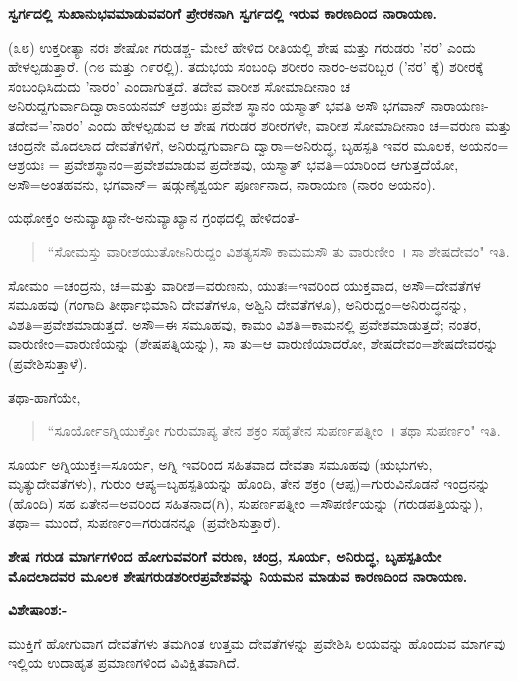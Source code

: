 \begin{center}
\textbf{ಸ್ವರ್ಗದಲ್ಲಿ ಸುಖಾನುಭವಮಾಡುವವರಿಗೆ ಪ್ರೇರಕನಾಗಿ ಸ್ವರ್ಗದಲ್ಲಿ ಇರುವ ಕಾರಣದಿಂದ ನಾರಾಯಣ.}
\end{center}

(೩೮) ಉಕ್ತರೀತ್ಯಾ ನರಃ ಶೇಷೋ ಗರುಡಶ್ಚ- ಮೇಲೆ ಹೇಳಿದ ರೀತಿಯಲ್ಲಿ ಶೇಷ ಮತ್ತು ಗರುಡರು 'ನರ' ಎಂದು ಹೇಳಲ್ಪಡುತ್ತಾರೆ. (೧೮ ಮತ್ತು ೧೯ರಲ್ಲಿ). ತದುಭಯ ಸಂಬಂಧಿ ಶರೀರಂ ನಾರಂ-ಅವರಿಬ್ಬರ ('ನರ' ಕ್ಕೆ) ಶರೀರಕ್ಕೆ ಸಂಬಂಧಿಸಿದುದು 'ನಾರಂ' ಎಂದಾಗುತ್ತದೆ. ತದೇವ ವಾರೀಶ ಸೋಮಾದೀನಾಂ ಚ ಅನಿರುದ್ದಗುರ್ವಾದಿದ್ವಾರಾಽಯನಮ್ ಆಶ್ರಯಃ ಪ್ರವೇಶ ಸ್ಥಾನಂ ಯಸ್ಮಾತ್ ಭವತಿ ಅಸೌ ಭಗವಾನ್ ನಾರಾಯಣಃ-ತದೇವ='ನಾರಂ' ಎಂದು ಹೇಳಲ್ಪಡುವ ಆ ಶೇಷ ಗರುಡರ ಶರೀರಗಳೇ, ವಾರೀಶ ಸೋಮಾದೀನಾಂ ಚ=ವರುಣ ಮತ್ತು ಚಂದ್ರನೇ ಮೊದಲಾದ ದೇವತೆಗಳಿಗೆ, ಅನಿರುದ್ದಗುರ್ವಾದಿ ದ್ವಾರಾ=ಅನಿರುದ್ಧ, ಬೃಹಸ್ಪತಿ ಇವರ ಮೂಲಕ, ಅಯನಂ= ಆಶ್ರಯಃ = ಪ್ರವೇಶಸ್ಥಾನಂ=ಪ್ರವೇಶಮಾಡುವ ಪ್ರದೇಶವು, ಯಸ್ಮಾತ್ ಭವತಿ=ಯಾರಿಂದ ಆಗುತ್ತದೆಯೋ, ಅಸೌ=ಅಂತಹವನು, ಭಗವಾನ್= ಷಡ್ಗುಣೈಶ್ವರ್ಯ ಪೂರ್ಣನಾದ, ನಾರಾಯಣ (ನಾರಂ ಅಯನಂ).

ಯಥೋಕ್ತಂ ಅನುವ್ಯಾಖ್ಯಾನೇ-ಅನುವ್ಯಾಖ್ಯಾನ ಗ್ರಂಥದಲ್ಲಿ ಹೇಳಿದಂತೆ-

\begin{verse}
``ಸೋಮಸ್ತು ವಾರೀಶಯುತೋsನಿರುದ್ದಂ ವಿಶತ್ಯಸಸೌ ಕಾಮಮಸೌ ತು ವಾರುಣೀಂ~। ಸಾ ಶೇಷದೇವಂ" ಇತಿ.
\end{verse}

ಸೋಮಂ =ಚಂದ್ರನು, ಚ=ಮತ್ತು ವಾರೀಶ=ವರುಣನು, ಯುತಃ=ಇವರಿಂದ ಯುಕ್ತವಾದ, ಅಸೌ=ದೇವತೆಗಳ ಸಮೂಹವು (ಗಂಗಾದಿ ತೀರ್ಥಾಭಿಮಾನಿ ದೇವತೆಗಳೂ, ಅಶ್ವಿನಿ ದೇವತೆಗಳೂ), ಅನಿರುದ್ದಂ=ಅನಿರುದ್ಧನನ್ನು, ವಿಶತಿ=ಪ್ರವೇಶಮಾಡುತ್ತದೆ. ಅಸೌ=ಈ ಸಮೂಹವು, ಕಾಮಂ ವಿಶತಿ=ಕಾಮನಲ್ಲಿ ಪ್ರವೇಶಮಾಡುತ್ತದೆ; ನಂತರ, ವಾರುಣೀಂ=ವಾರುಣಿಯನ್ನು (ಶೇಷಪತ್ನಿಯನ್ನು), ಸಾ ತು=ಆ ವಾರುಣಿಯಾದರೋ, ಶೇಷದೇವಂ=ಶೇಷದೇವರನ್ನು (ಪ್ರವೇಶಿಸುತ್ತಾಳೆ).

ತಥಾ-ಹಾಗೆಯೇ,

\begin{verse}
``ಸೂರ್ಯೋಽಗ್ನಿಯುಕ್ತೋ ಗುರುಮಾಪ್ಯ ತೇನ ಶಕ್ರಂ ಸಹೈತೇನ ಸುಪರ್ಣಪತ್ನೀಂ~। ತಥಾ ಸುಪರ್ಣಂ" ಇತಿ.
\end{verse}

ಸೂರ್ಯ ಅಗ್ನಿಯುಕ್ತಃ=ಸೂರ್ಯ, ಅಗ್ನಿ ಇವರಿಂದ ಸಹಿತವಾದ ದೇವತಾ ಸಮೂಹವು (ಋಭುಗಳು, ಮೃತ್ಯುದೇವತೆಗಳು), ಗುರುಂ ಆಪ್ಯ=ಬೃಹಸ್ಪತಿಯನ್ನು ಹೊಂದಿ, ತೇನ ಶಕ್ರಂ (ಆಪ್ಪ)=ಗುರುವಿನೊಡನೆ ಇಂದ್ರನನ್ನು (ಹೊಂದಿ) ಸಹ ಏತೇನ=ಅವರಿಂದ ಸಹಿತನಾದ(ಗಿ), ಸುಪರ್ಣಪತ್ನೀಂ =ಸೌಪರ್ಣಿಯನ್ನು (ಗರುಡಪತ್ತಿಯನ್ನು), ತಥಾ= ಮುಂದೆ, ಸುಪರ್ಣಂ=ಗರುಡನನ್ನೂ (ಪ್ರವೇಶಿಸುತ್ತಾರೆ).

\begin{center}
\textbf{ಶೇಷ ಗರುಡ ಮಾರ್ಗಗಳಿಂದ ಹೋಗುವವರಿಗೆ ವರುಣ, ಚಂದ್ರ, ಸೂರ್ಯ, ಅನಿರುದ್ಧ, ಬೃಹಸ್ಪತಿಯೇ ಮೊದಲಾದವರ ಮೂಲಕ ಶೇಷಗರುಡಶರೀರಪ್ರವೇಶವನ್ನು ನಿಯಮನ ಮಾಡುವ ಕಾರಣದಿಂದ ನಾರಾಯಣ.}
\end{center}

\noindent
\textbf{ವಿಶೇಷಾಂಶ:-}

ಮುಕ್ತಿಗೆ ಹೋಗುವಾಗ ದೇವತೆಗಳು ತಮಗಿಂತ ಉತ್ತಮ ದೇವತೆಗಳನ್ನು ಪ್ರವೇಶಿಸಿ ಲಯವನ್ನು ಹೊಂದುವ ಮಾರ್ಗವು ಇಲ್ಲಿಯ ಉದಾಹೃತ ಪ್ರಮಾಣಗಳಿಂದ ವಿವಿಕ್ಷಿತವಾಗಿದೆ.

